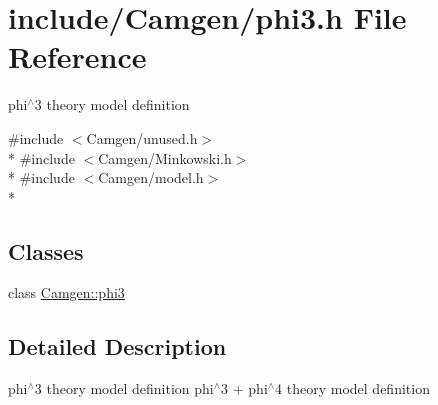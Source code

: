 \hypertarget{a00695}{\section{include/\-Camgen/phi3.h File Reference}
\label{a00695}
}


phi$^\wedge$3 theory model definition  


{\ttfamily \#include $<$Camgen/unused.\-h$>$}\\*
{\ttfamily \#include $<$Camgen/\-Minkowski.\-h$>$}\\*
{\ttfamily \#include $<$Camgen/model.\-h$>$}\\*
\subsection*{Classes}
\begin{DoxyCompactItemize}
\item 
class \hyperlink{a00418}{Camgen\-::phi3}
\end{DoxyCompactItemize}


\subsection{Detailed Description}
phi$^\wedge$3 theory model definition phi$^\wedge$3 + phi$^\wedge$4 theory model definition